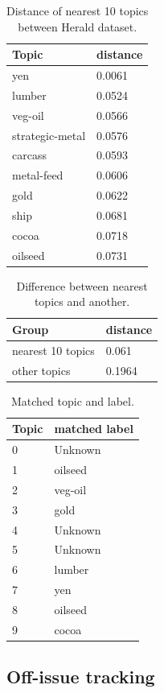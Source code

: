 \begin{table}[!htbp]
  \begin{tabular}{l|l}
  Topic & distance \\ \hline
  yen & 0.0061 \\
  lumber & 0.0524 \\
  veg-oil & 0.0566 \\
  strategic-metal & 0.0576 \\
  carcass & 0.0593 \\
  metal-feed & 0.0606 \\
  gold & 0.0622 \\
  ship & 0.0681 \\
  cocoa & 0.0718 \\
  oilseed & 0.0731
  \end{tabular}
  \caption{Distance of nearest 10 topics between Herald dataset.}
  \label{table:topicdistance}
\end{table}


\begin{table}[!htbp]
  \begin{tabular}{l|l}
  Group & distance \\ \hline
  nearest 10 topics & 0.061 \\
  other topics & 0.1964
  \end{tabular}
  \caption{Difference between nearest topics and another.}
  \label{table:groupdistance}
\end{table}

\begin{table}[!htbp]
  \begin{tabular}{l|l}
      Topic & matched label \\ \hline
      0 & Unknown \\
      1 & oilseed \\
      2 & veg-oil \\
      3 & gold \\
      4 & Unknown \\
      5 & Unknown \\
      6 & lumber \\
      7 & yen \\
      8 & oilseed \\
      9 & cocoa \\
  \end{tabular}
  \caption{Matched topic and label.}
  \label{table:matchedtopic}
\end{table}



\subsection{Off-issue tracking}

